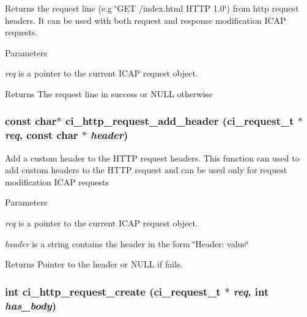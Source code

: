 Returns the request line (e.g \char`\"{}GET /index.html HTTP 1.0\char`\"{}) from http request headers. It can be used with both request and response modification ICAP requests. 
\begin{DoxyParams}{Parameters}
\item[{\em req}]is a pointer to the current ICAP request object. \end{DoxyParams}
\begin{DoxyReturn}{Returns}
The request line in success or NULL otherwise 
\end{DoxyReturn}
\hypertarget{group__HTTP_ga2771dada488942b12bcc60ae1ea35574}{
\subsubsection[{ci\_\-http\_\-request\_\-add\_\-header}]{\setlength{\rightskip}{0pt plus 5cm}const char$\ast$ ci\_\-http\_\-request\_\-add\_\-header ({\bf ci\_\-request\_\-t} $\ast$ {\em req}, \/  const char $\ast$ {\em header})}}
\label{group__HTTP_ga2771dada488942b12bcc60ae1ea35574}


Add a custom header to the HTTP request headers. This function can used to add custom headers to the HTTP request and can be used only for request modification ICAP requests 
\begin{DoxyParams}{Parameters}
\item[{\em req}]is a pointer to the current ICAP request object. \item[{\em header}]is a string contains the header in the form \char`\"{}Header: value\char`\"{} \end{DoxyParams}
\begin{DoxyReturn}{Returns}
Pointer to the header or NULL if fails. 
\end{DoxyReturn}
\hypertarget{group__HTTP_ga7c44c88b00ba822fdeffa9bef6a83adf}{
\subsubsection[{ci\_\-http\_\-request\_\-create}]{\setlength{\rightskip}{0pt plus 5cm}int ci\_\-http\_\-request\_\-create ({\bf ci\_\-request\_\-t} $\ast$ {\em req}, \/  int {\em has\_\-body})}}
\label{group__HTTP_ga7c44c88b00ba822fdeffa9bef6a83adf}


